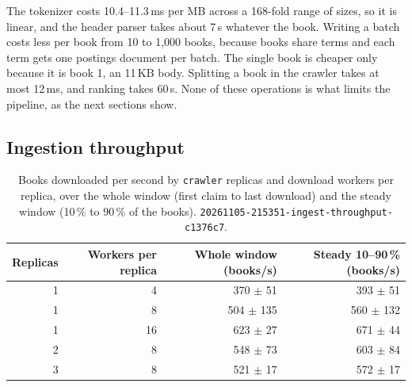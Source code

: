 \documentclass[11pt,a4paper]{article}
\newcommand{\code}[1]{\nolinkurl{#1}}
\newcommand{\run}[1]{\nolinkurl{#1}}
\begin{document}
The tokenizer costs 10.4--11.3\,ms per MB across a 168-fold range of sizes, so it is linear, and the header parser
takes about 7\,\textmu s whatever the book. Writing a batch costs less per book from 10 to 1{,}000 books, because books
share terms and each term gets one postings document per batch. The single book is cheaper only because it is book 1,
an 11\,KB body. Splitting a book in the crawler takes at most 12\,ms, and ranking takes 60\,\textmu s. None of these
operations is what limits the pipeline, as the next sections show.

\subsection{Ingestion throughput}
\label{sec:ingest}

\begin{table}[ht]
\centering
\small
\caption{Books downloaded per second by \code{crawler} replicas and download workers per replica, over the whole window
(first claim to last download) and the steady window (10\,\% to 90\,\% of the books).
\run{20261105-215351-ingest-throughput-c1376c7}.}
\label{tab:ingest}
\begin{tabular}{@{}rrrr@{}}
\toprule
Replicas & Workers per replica & Whole window (books/s) & Steady 10--90\,\% (books/s) \\
\midrule
1 & 4 & 370 $\pm$ 51 & 393 $\pm$ 51 \\
1 & 8 & 504 $\pm$ 135 & 560 $\pm$ 132 \\
1 & 16 & 623 $\pm$ 27 & 671 $\pm$ 44 \\
2 & 8 & 548 $\pm$ 73 & 603 $\pm$ 84 \\
3 & 8 & 521 $\pm$ 17 & 572 $\pm$ 17 \\
\bottomrule
\end{tabular}
\end{table}
\end{document}
